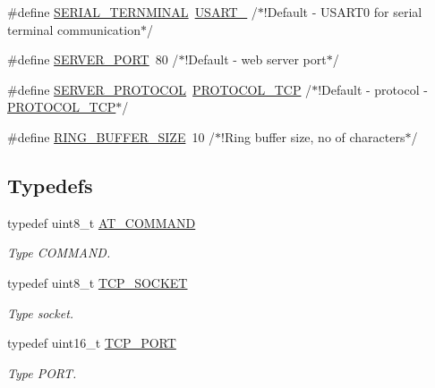 \begin{DoxyCompactItemize}
\item 
\#define \hyperlink{group__wireless__interface_gac084052928657b7b0d2e09b4e0c3b6d3}{S\+E\+R\+I\+A\+L\+\_\+\+T\+E\+R\+N\+M\+I\+N\+AL}~\hyperlink{group__usart_async_module_ggaae3c5ea77a411e5f40e4377f77067b86a4ee9bfd4dd9ae53d762cc046ce72c892}{U\+S\+A\+R\+T\+\_}			/$\ast$!Default -\/ U\+S\+A\+R\+T0 for serial terminal communication$\ast$/
\item 
\#define \hyperlink{group__wireless__interface_gac42367fe5c999ec6650de83e9d72fe8c}{S\+E\+R\+V\+E\+R\+\_\+\+P\+O\+RT}~80				/$\ast$!Default -\/ web server port$\ast$/
\item 
\#define \hyperlink{group__wireless__interface_ga07996641fe1babf4c89fc245099d9645}{S\+E\+R\+V\+E\+R\+\_\+\+P\+R\+O\+T\+O\+C\+OL}~\hyperlink{group__wireless__interface_gga2966051bfea778d846d94013f7cb888dae991c7cad918269624b3c28147e18a93}{P\+R\+O\+T\+O\+C\+O\+L\+\_\+\+T\+CP}	/$\ast$!Default -\/ protocol -\/ \hyperlink{group__wireless__interface_gga2966051bfea778d846d94013f7cb888dae991c7cad918269624b3c28147e18a93}{P\+R\+O\+T\+O\+C\+O\+L\+\_\+\+T\+CP}$\ast$/
\item 
\#define \hyperlink{group__wireless__interface_ga779b513296068d2a6186659183ff3c2c}{R\+I\+N\+G\+\_\+\+B\+U\+F\+F\+E\+R\+\_\+\+S\+I\+ZE}~10				/$\ast$!Ring buffer size, no of characters$\ast$/
\end{DoxyCompactItemize}
\subsection*{Typedefs}
\begin{DoxyCompactItemize}
\item 
typedef uint8\+\_\+t \hyperlink{group__wireless__interface_ga4086b0cc4b349f6204256017ac437d3f}{A\+T\+\_\+\+C\+O\+M\+M\+A\+ND}
\begin{DoxyCompactList}\small\item\em Type C\+O\+M\+M\+A\+ND. \end{DoxyCompactList}\item 
typedef uint8\+\_\+t \hyperlink{group__wireless__interface_gab2d7ad3f99c2b04b0f5f5a77eefc5355}{T\+C\+P\+\_\+\+S\+O\+C\+K\+ET}
\begin{DoxyCompactList}\small\item\em Type socket. \end{DoxyCompactList}\item 
typedef uint16\+\_\+t \hyperlink{group__wireless__interface_ga6be486e56223df1b41c1f3a04cb7d471}{T\+C\+P\+\_\+\+P\+O\+RT}
\begin{DoxyCompactList}\small\item\em Type P\+O\+RT. \end{DoxyCompactList}\end{DoxyCompactItemize}
